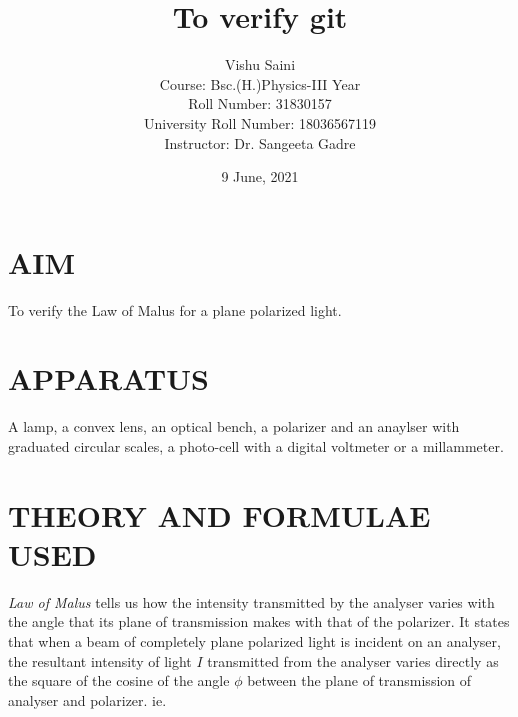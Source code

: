 \documentclass[11pt,a4paper]{article}
\begin{document}



\title{\textbf{To verify git}}
\author{Vishu Saini\\
	Course:  Bsc.(H.)Physics-III Year\\
	Roll Number:  31830157\\			
	University Roll Number: 18036567119\\
	Instructor: Dr. Sangeeta Gadre}
\date{9 June, 2021}
\maketitle
%


%

\thispagestyle{fancy}


\section*{AIM}
To verify the Law of Malus for a plane polarized light.

\section*{APPARATUS}
A lamp, a convex lens, an optical bench, a polarizer and an anaylser with graduated circular scales, a photo-cell with a digital voltmeter or a millammeter.

\section*{THEORY AND FORMULAE USED}
\textit{Law of Malus} tells us how the intensity transmitted by the analyser varies with the angle that its plane of transmission makes with that of the polarizer.
It states that when a beam of completely plane polarized light is incident on an analyser, the resultant intensity of light $I$ transmitted from the analyser varies directly as the square of the cosine of the angle
$\phi$ between the plane of transmission of analyser and polarizer. ie.
\end{document}
